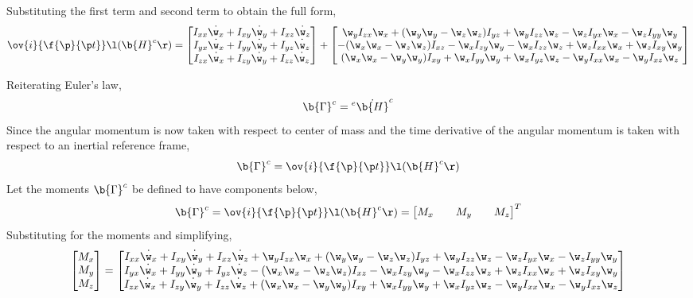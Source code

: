\documentclass[a4paper, 12pt]{report}
\begin{document}
\begin{center}
Substituting the first term and second term to obtain the full form,
$$\ov{i}{\f{\p}{\p t}}\l(\b{H}^c\r) = 
\begin{bmatrix} 
I_{xx}\dot{\w_x} + I_{xy}\dot{\w_y} + I_{xz}\dot{\w_z} \\
I_{yx}\dot{\w_x} + I_{yy}\dot{\w_y} + I_{yz}\dot{\w_z} \\
I_{zx}\dot{\w_x} + I_{zy}\dot{\w_y} + I_{zz}\dot{\w_z}
\end{bmatrix} + \begin{bmatrix}
\w_yI_{zx}\w_x + (\w_y\w_y - \w_z\w_z)I_{yz} + \w_yI_{zz}\w_z - \w_zI_{yx}\w_x - \w_zI_{yy}\w_y \\
-(\w_x\w_x - \w_z\w_z)I_{xz} - \w_xI_{zy}\w_y - \w_xI_{zz}\w_z + \w_zI_{xx}\w_x + \w_zI_{xy}\w_y \\
(\w_x\w_x - \w_y\w_y)I_{xy} + \w_xI_{yy}\w_y + \w_xI_{yz}\w_z - \w_yI_{xx}\w_x  - \w_yI_{xz}\w_z
\end{bmatrix}$$

Reiterating Euler's law,
$$\b{\Gamma}^{c} = {}^{e}\dot{\b{H}}^{c}$$
Since the angular momentum is now taken with respect to center of mass and the time derivative of the angular momentum is taken with respect to an inertial reference frame,
$$\b{\Gamma}^{c} = \ov{i}{\f{\p}{\p t}}\l(\b{H}^c\r)$$
Let the moments $\b{\Gamma}^{c}$ be defined to have components below,
$$\b{\Gamma}^{c} = \ov{i}{\f{\p}{\p t}}\l(\b{H}^c\r) = \begin{bmatrix}M_x && M_y && M_z\end{bmatrix}^T$$
Substituting for the moments and simplifying,
$$\begin{bmatrix}M_x \\ M_y \\ M_z\end{bmatrix} = 
\begin{bmatrix} 
I_{xx}\dot{\w_x} + I_{xy}\dot{\w_y} + I_{xz}\dot{\w_z}  + \w_yI_{zx}\w_x + (\w_y\w_y - \w_z\w_z)I_{yz} + \w_yI_{zz}\w_z - \w_zI_{yx}\w_x - \w_zI_{yy}\w_y\\
I_{yx}\dot{\w_x} + I_{yy}\dot{\w_y} + I_{yz}\dot{\w_z} - (\w_x\w_x - \w_z\w_z)I_{xz} - \w_xI_{zy}\w_y - \w_xI_{zz}\w_z + \w_zI_{xx}\w_x + \w_zI_{xy}\w_y\\
I_{zx}\dot{\w_x} + I_{zy}\dot{\w_y} + I_{zz}\dot{\w_z} + (\w_x\w_x - \w_y\w_y)I_{xy} + \w_xI_{yy}\w_y + \w_xI_{yz}\w_z - \w_yI_{xx}\w_x  - \w_yI_{xz}\w_z
\end{bmatrix}$$


\end{center}
\end{document}
